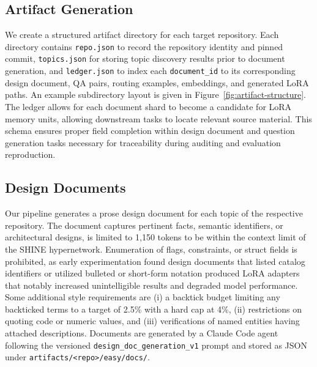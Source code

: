 \documentclass[conference,10.5pt]{IEEEtran}
\begin{document}
\subsection{Artifact Generation}
We create a structured artifact directory for each target repository. Each directory contains \texttt{repo.json} to record the repository identity and pinned commit, \texttt{topics.json} for storing topic discovery results prior to document generation, and \texttt{ledger.json} to index each \texttt{document\_id} to its corresponding design document, QA pairs, routing examples, embeddings, and generated LoRA paths. An example subdirectory layout is given in Figure~\ref{fig:artifact-structure}. The ledger allows for each document shard to become a candidate for LoRA memory units, allowing downstream tasks to locate relevant source material. This schema ensures proper field completion within design document and question generation tasks necessary for traceability during auditing and evaluation reproduction.


\subsection{Design Documents}
Our pipeline generates a prose design document for each topic of the respective repository. The  document captures pertinent facts, semantic identifiers, or architectural designs, is limited to 1,150 tokens to be within the context limit of the SHINE hypernetwork. Enumeration of flags, constraints, or struct fields is prohibited, as early experimentation found design documents that listed catalog identifiers or utilized bulleted or short-form notation produced LoRA adapters that notably increased unintelligible results and degraded model performance. Some additional style requirements are (i) a backtick budget limiting any backticked terms to a target of 2.5\% with a hard cap at 4\%, (ii) restrictions on quoting code or numeric values, and (iii) verifications of named entities having attached descriptions. Documents are generated by a Claude Code agent following the versioned \texttt{design\_doc\_generation\_v1} prompt and stored as JSON under \texttt{artifacts/<repo>/easy/docs/}.
\end{document}
